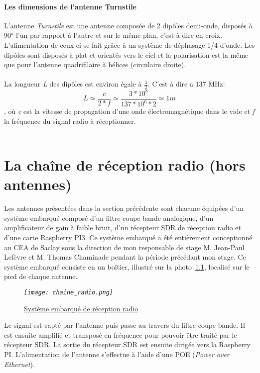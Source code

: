 \documentclass[12pt,fleqn]{book} %
\begin{document}
\subsubsection{Les dimensions de l'antenne Turnstile}
\noindent L'antenne \emph{Turnstile} est une antenne composée de 2 dipôles demi-onde, disposés à 90° l'un par rapport à l'autre et sur le même plan, c'est à dire en croix. L'alimentation de ceux-ci se fait grâce à un système de déphasage 1/4 d'onde. Les dipôles sont disposés à plat et orientés vers le ciel et la polarisation est la même que pour l'antenne quadrifilaire à hélices (circulaire droite).
~\\\\La longueur \emph{L} des dipôles est environ égale à \(\frac{\lambda}{2}\). C'est à dire a 137 MHz:
$$ L\simeq\frac{c}{2*f}\simeq \frac{3*10^8}{137*10^6*2}\simeq1 m$$, où \emph{c} est la vitesse de propagation d'une onde électromagnétique dans le vide et \emph{f} la fréquence du signal radio à réceptionner.
~\\\\
\chapter{La chaîne de réception radio (hors antennes)}
Les antennes présentées dans la section précédente sont chacune équipées d'un système embarqué composé d'un filtre coupe bande analogique, d'un amplificateur de gain à faible bruit, d'un récepteur SDR de réception radio et d'une carte Raspberry PI3. Ce système embarqué a été entièrement conceptionné au CEA de Saclay sous la direction de mon responsable de stage M. Jean-Paul Lefèvre et M. Thomas Chaminade pendant la période précédant mon stage.
Ce système embarqué consiste en un boîtier, illustré sur la photo~\underline{\color{blue}\ref{boîtier}}, localisé sur le pied de chaque antenne.
\begin{figure}[H]
	\centering
	\itshape
	\texttt{[image: chaine\_radio.png]}
	\caption{\label{boîtier} \underline{Système embarqué de réception radio}}
\end{figure}
Le signal est capté par l'antenne puis passe au travers du filtre coupe bande. Il est ensuite amplifié et transposé en fréquence pour pouvoir être traité par le récepteur SDR. La sortie du récepteur SDR est ensuite dirigée vers la Raspberry PI. L'alimentation de l'antenne s'effectue à l'aide d'une POE (\emph{Power over Ethernet}).
\end{document}
